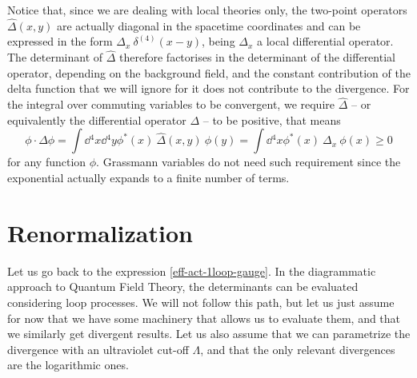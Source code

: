 Notice that, since we are dealing with local theories only, the two-point operators $\hat \Delta(x,y)$ are actually diagonal in the spacetime coordinates and can be expressed in the form $\Delta_x\: \delta^{(4)}(x-y)$, being $\Delta_x$ a local differential operator. The determinant of $\hat \Delta$ therefore factorises in the determinant of the differential operator, depending on the background field, and the constant contribution of the delta function that we will ignore for it does not contribute to the divergence. For the integral over commuting variables to be convergent, we require $\hat \Delta$ -- or equivalently the differential operator $\Delta$ -- to be positive, that means 
\begin{equation}
\phi \cdot \hat \Delta \phi 
	=
\int \dd{^4 x} \dd{^4 y} \phi^*(x) \: \hat \Delta(x,y)  \: \phi(y)
	=
\int \dd{^4 x} \phi^*(x) \:  \Delta_x  \: \phi(x)
	\geq
0
\end{equation}
for any function $\phi$. Grassmann variables do not need such requirement since the exponential actually expands to a finite number of terms.



\section{Renormalization}

Let us go back to the expression \eqref{eff-act-1loop-gauge}. In the diagrammatic approach to Quantum Field Theory, the determinants can be evaluated considering loop processes. We will not follow this path, but let us just assume for now that we have some machinery that allows us to evaluate them, and that we similarly get divergent results. Let us also assume that we can parametrize the divergence with an ultraviolet cut-off $\Lambda$, and that the only relevant divergences are the logarithmic ones. 



